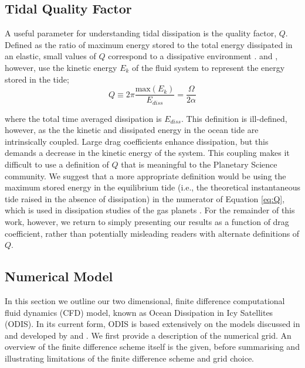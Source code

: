 \subsection{Tidal Quality Factor}

A useful parameter for understanding tidal dissipation is the quality factor, $Q$. Defined as the ratio of maximum energy stored to the total energy dissipated in an elastic, small values of $Q$ correspond to a dissipative environment \citep{goldreich1966q}. \citet{tyler2011tidal} and \citet{matsuyama2014tidal}, however, use the kinetic energy $E_k$ of the fluid system to represent the energy stored in the tide;
\begin{equation}\label{eq:Q}
Q \equiv 2 \pi \dfrac{\text{max} \left( E_{k} \right)}{E_{diss}} = \dfrac{\Omega}{2 \alpha}
\end{equation}

where the total time averaged dissipation is $E_{diss}$. This definition is ill-defined, however, as the the kinetic and dissipated energy in the ocean tide are intrinsically coupled. Large drag coefficients enhance dissipation, but this demands a decrease in the kinetic energy of the system. This coupling makes it difficult to use a definition of $Q$ that is meaningful to the Planetary Science community. We suggest that a more appropriate definition would be using the maximum stored energy in the equilibrium tide (i.e., the theoretical instantaneous tide raised in the absence of dissipation) in the numerator of Equation \ref{eq:Q}, which is used in dissipation studies of the gas planets \citep{goldreich1966q}. For the remainder of this work, however, we return to simply presenting our results as a function of drag coefficient, rather than potentially misleading readers with alternate definitions of $Q$. 

\subsection{Numerical Model \label{subsec:model}}

In this section we outline our two dimensional, finite difference computational fluid dynamics (CFD) model, known as Ocean Dissipation in Icy Satellites (ODIS). In its current form, ODIS is based extensively on the models discussed in and developed by \citet{zahel1973diurnalk,zahel1978influence} and \citet{sears1994tidal,sears1995tidal}. We first provide a description of the numerical grid. An overview of the finite difference scheme itself is the given, before summarising and illustrating limitations of the finite difference scheme and grid choice.

